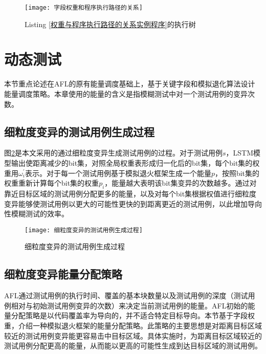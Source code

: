 \begin{figure}[htb]
\begin{center}
\texttt{[image: 字段权重和程序执行路径的关系]}
\end{center}
\caption{Listing \ref{权重与程序执行路径的关系实例程序}的执行树}
\label{字段权重和程序执行路径的关系}
\end{figure}


\section{动态测试}
\label{基于字段权重的模糊测试能量调度策略}

本节重点论述在AFL的原有能量调度基础上，基于关键字段和模拟退化算法设计能量调度策略。本章使用的能量的含义是指模糊测试中对一个测试用例的变异次数。

\subsection{细粒度变异的测试用例生成过程}

图\ref{细粒度变异的测试用例生成过程}是本文采用的通过细粒度变异生成测试用例的过程。对于测试用例$s$，LSTM模型输出使距离减少的bit集，对照全局权重表形成归一化后的bit集，每个bit集的权重用$\omega^{'}_{i}$表示。对于每一个测试用例基于模拟退火框架生成一个能量$p$，按照bit集的权重重新计算每个bit集的权重$p_i$，能量越大表明该bit集变异的次数越多。通过对靠近目标区域的测试用例分配更多的能量，以及对每个bit集根据权值进行细粒度变异能够使测试用例以更大的可能性更快的到距离更近的测试用例，以此增加导向性模糊测试的效率。

\begin{figure}[htb]
\begin{center}
\texttt{[image: 细粒度变异的测试用例生成过程]}
\end{center}
\caption{细粒度变异的测试用例生成过程}
\label{细粒度变异的测试用例生成过程}
\end{figure}


\subsection{细粒度变异能量分配策略}

AFL通过测试用例的执行时间、覆盖的基本块数量以及测试用例的深度（测试用例相对与初始测试用例变异的次数）来决定当前测试用例的能量。AFL初始的能量分配策略是以代码覆盖率为导向的，并不适合特定目标导向。本节基于字段权重，介绍一种模拟退火框架的能量分配策略。此策略的主要思想是对距离目标区域较近的测试用例变异能更容易击中目标区域。具体实施时，为距离目标区域较近的测试用例分配更高的能量，从而能以更高的可能性生成到达目标区域的测试用例。

